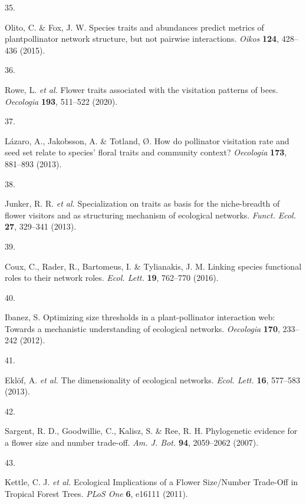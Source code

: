 \documentclass[
  12pt,
  a4paper,
]{article}
\newlength{\cslhangindent}
\newlength{\csllabelwidth}
\newlength{\cslentryspacingunit} %
\newenvironment{CSLReferences}[2] %
 {%
  \setlength{\parindent}{0pt}
  \ifodd #1
  \let\oldpar\par
  \def\par{\hangindent=\cslhangindent\oldpar}
  \fi
  \setlength{\parskip}{#2\cslentryspacingunit}
 }%
 {}
\newcommand{\CSLLeftMargin}[1]{\parbox[t]{\csllabelwidth}{#1}}
\newcommand{\CSLRightInline}[1]{\parbox[t]{\linewidth - \csllabelwidth}{#1}\break}
\begin{document}
\begin{CSLReferences}{0}{0}
\leavevmode{}%
\CSLLeftMargin{35. }
\CSLRightInline{Olito, C. \& Fox, J. W. Species traits and abundances predict metrics of plant\textendash pollinator network structure, but not pairwise interactions. \emph{Oikos} \textbf{124}, 428--436 (2015).}

\leavevmode{}%
\CSLLeftMargin{36. }
\CSLRightInline{Rowe, L. \emph{et al.} Flower traits associated with the visitation patterns of bees. \emph{Oecologia} \textbf{193}, 511--522 (2020).}

\leavevmode{}%
\CSLLeftMargin{37. }
\CSLRightInline{Lázaro, A., Jakobsson, A. \& Totland, Ø. How do pollinator visitation rate and seed set relate to species' floral traits and community context? \emph{Oecologia} \textbf{173}, 881--893 (2013).}

\leavevmode{}%
\CSLLeftMargin{38. }
\CSLRightInline{Junker, R. R. \emph{et al.} Specialization on traits as basis for the niche-breadth of flower visitors and as structuring mechanism of ecological networks. \emph{Funct. Ecol.} \textbf{27}, 329--341 (2013).}

\leavevmode{}%
\CSLLeftMargin{39. }
\CSLRightInline{Coux, C., Rader, R., Bartomeus, I. \& Tylianakis, J. M. Linking species functional roles to their network roles. \emph{Ecol. Lett.} \textbf{19}, 762--770 (2016).}

\leavevmode{}%
\CSLLeftMargin{40. }
\CSLRightInline{Ibanez, S. Optimizing size thresholds in a plant-pollinator interaction web: Towards a mechanistic understanding of ecological networks. \emph{Oecologia} \textbf{170}, 233--242 (2012).}

\leavevmode{}%
\CSLLeftMargin{41. }
\CSLRightInline{Eklöf, A. \emph{et al.} The dimensionality of ecological networks. \emph{Ecol. Lett.} \textbf{16}, 577--583 (2013).}

\leavevmode{}%
\CSLLeftMargin{42. }
\CSLRightInline{Sargent, R. D., Goodwillie, C., Kalisz, S. \& Ree, R. H. Phylogenetic evidence for a flower size and number trade-off. \emph{Am. J. Bot.} \textbf{94}, 2059--2062 (2007).}

\leavevmode{}%
\CSLLeftMargin{43. }
\CSLRightInline{Kettle, C. J. \emph{et al.} Ecological {Implications} of a {Flower Size}/{Number Trade}-{Off} in {Tropical Forest Trees}. \emph{PLoS One} \textbf{6}, e16111 (2011).}


\end{CSLReferences}
\end{document}
